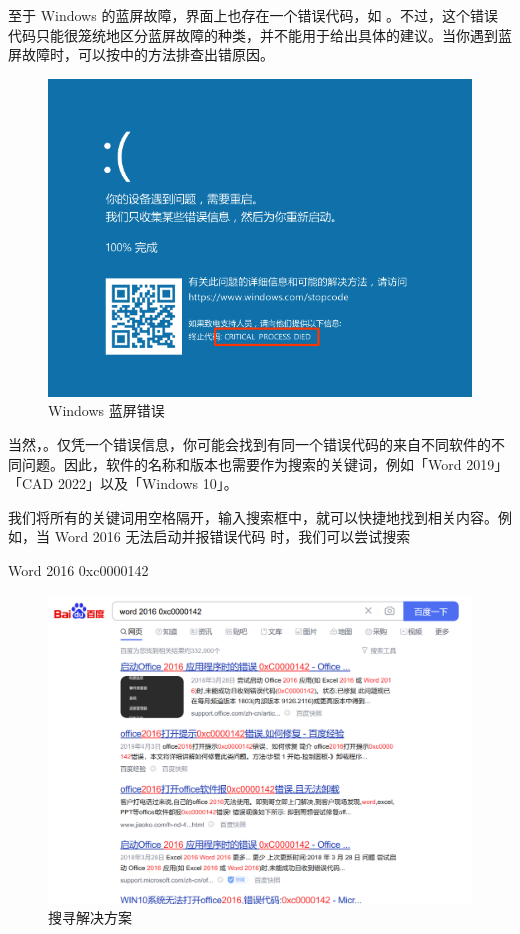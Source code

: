至于 Windows 的蓝屏故障，界面上也存在一个错误代码，如 。不过，这个错误代码只能很笼统地区分蓝屏故障的种类，并不能用于给出具体的建议。当你遇到蓝屏故障时，可以按中的方法排查出错原因。

\begin{figure}[htb!]
  \centering
  \includegraphics[width=.65\textwidth]{assets/basic/Win-10-BSoD.png}
  \caption{Windows 蓝屏错误}
  \label{fig:Win-10-BSoD}
\end{figure}

当然，。仅凭一个错误信息，你可能会找到有同一个错误代码的来自不同软件的不同问题。因此，软件的名称和版本也需要作为搜索的关键词，例如「Word 2019」「CAD 2022」以及「Windows 10」。

我们将所有的关键词用空格隔开，输入搜索框中，就可以快捷地找到相关内容。例如，当 Word 2016 无法启动并报错误代码  时，我们可以尝试搜索

\begin{quoting}
  Word 2016 0xc0000142
\end{quoting}

\begin{figure}[htb!]
  \centering
  \includegraphics[width=.9\textwidth]{assets/basic/Searching_for_err_code.png}
  \caption{搜寻解决方案}
  \label{fig:Searching_for_err_code}
\end{figure}

